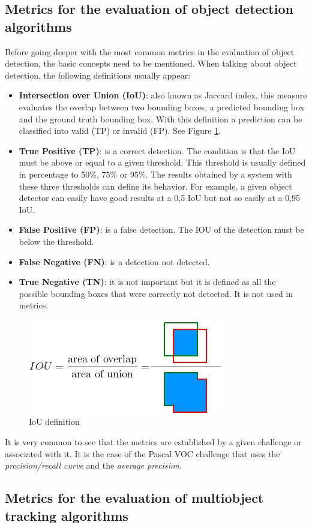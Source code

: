 \subsection{Metrics for the evaluation of object detection algorithms}
Before going deeper with the most common metrics in the evaluation of object detection, the basic concepts need to be mentioned. When talking about object detection, the following definitions usually appear:
\begin{itemize}
    \item \textbf{Intersection over Union (IoU)}: also known as Jaccard index, this measure evaluates the overlap between two bounding boxes, a predicted bounding box and the ground truth bounding box. With this definition a prediction can be classified into valid (TP) or invalid (FP). See Figure \ref{fig:iou}.
    \item \textbf{True Positive (TP)}: is a correct detection. The condition is that the IoU must be above or equal to a given threshold. This threshold is usually defined in percentage to 50\%, 75\% or 95\%. The results obtained by a system with these three thresholds can define its behavior. For example, a given object detector can easily have good results at a 0,5 IoU but not so easily at a 0,95 IoU.
    \item \textbf{False Positive (FP)}: is a false detection. The IOU of the detection must be below the threshold.
    \item \textbf{False Negative (FN)}: is a detection not detected.
    \item \textbf{True Negative (TN)}: it is not important but it is defined as all the possible bounding boxes that were correctly not detected. It is not used in metrics.
\end{itemize}
\begin{figure}[H]
\begin{center}
\includegraphics[scale=0.45]{figures/iou.png}
\caption{IoU definition} %
\label{fig:iou}
\end{center}
\end{figure}
It is very common to see that the metrics are established by a given challenge or associated with it. It is the case of the Pascal VOC challenge that uses the \textit{precision/recall curve} and the \textit{average precision}.\\

\subsection{Metrics for the evaluation of multiobject tracking algorithms}